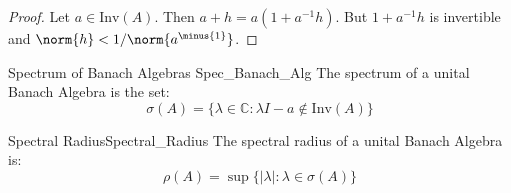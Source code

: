     \begin{proof}
        Let $a\in\mathrm{Inv}(A)$. Then
        $a+h=a(1+a^{\minus{1}}h)$. But $1+a^{\minus{1}}h$ is
        invertible and $\norm{h}<1/\norm{a^{\minus{1}}}$.
    \end{proof}
    \begin{ldefinition}{Spectrum of Banach Algebras}
          {Spec_Banach_Alg}
        The spectrum of a unital Banach Algebra is the set:
        \begin{equation}
            \sigma(A)=\{\lambda\in\mathbb{C}:
                \lambda{I}-a\notin\mathrm{Inv}(A)\}
        \end{equation}
    \end{ldefinition}
    \begin{ldefinition}{Spectral Radius}{Spectral_Radius}
        The spectral radius of a unital Banach Algebra is:
        \begin{equation}
            \rho(A)=\sup\{|\lambda|:\lambda\in\sigma(A)\}
        \end{equation}
    \end{ldefinition}
